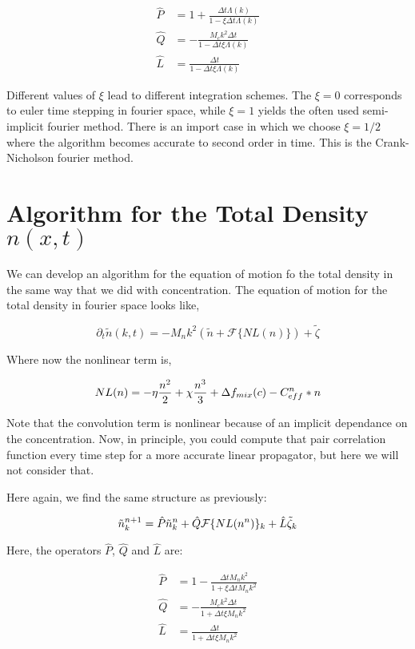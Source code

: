 \begin{align}
\hat{P} &= 1 + \frac{\Delta t \Lambda(k)}{1 - \xi\Delta t \Lambda(k)}  \\
\hat{Q} &= -\frac{M_c k^2 \Delta t}{1 - \Delta t \xi \Lambda(k)} \\
\hat{L} &= \frac{\Delta t}{1 - \Delta t \xi \Lambda(k)} 
\end{align}

Different values of $\xi$ lead to different integration schemes. The $\xi = 0$ corresponds to euler time stepping in fourier space, while $\xi = 1$ yields the often used semi-implicit fourier method. There is an import case in which we choose $\xi = 1/2$ where the algorithm becomes accurate to second order in time. This is the Crank-Nicholson fourier method. 

\section{Algorithm for the Total Density $n(x,t)$}

We can develop an algorithm for the equation of motion fo the total density in the same way that we did with concentration. The equation of motion for the total density in fourier space looks like, 

\begin{equation}
\partial_t \tilde{n}(k, t) = -M_n k^2 \left(\tilde{n} + \mathcal{F}\lbrace NL(n)\rbrace\right) + \tilde{\zeta}
\end{equation}

Where now the nonlinear term is, 

\begin{equation}
NL(n) = -\eta \frac{n^2}{2} + \chi \frac{n^3}{3}  + \Delta f_{mix}(c) - C_{eff}^n \ast n  
\end{equation}

Note that the convolution term is nonlinear because of an implicit dependance on the concentration. Now, in principle, you could compute that pair correlation function every time step for a more accurate linear propagator, but here we will not consider that. 

Here again, we find the same structure as previously:

\begin{equation}
\tilde{n}_k^{n+1} = \hat{P}\tilde{n}_k^n + \hat{Q}\mathcal{F}\lbrace NL(n^n)\rbrace_k + \hat{L} \tilde{\zeta}_k
\end{equation}

Here, the operators $\hat{P}$, $\hat{Q}$ and $\hat{L}$ are:

\begin{align}
\hat{P} &= 1 - \frac{\Delta t M_n k^2}{1 + \xi\Delta t M_n k^2}  \\
\hat{Q} &= -\frac{M_c k^2 \Delta t}{1 + \Delta t \xi M_n k^2} \\
\hat{L} &= \frac{\Delta t}{1 + \Delta t \xi M_n k^2} 
\end{align}

